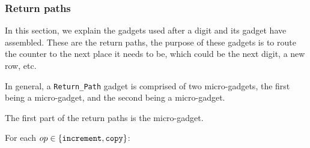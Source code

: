 

\subsubsection{ Return paths}
In this section, we explain the gadgets used after a digit and its {\dtop} gadget have assembled. These
are the return paths, the purpose of these gadgets is to route the counter to the next place it needs to be, which
could be the next digit, a new row, etc.

In general, a {\tt Return\_Path} gadget is comprised of two micro-gadgets, the first being a {\returnfromdigit} micro-gadget, and
the second being a {\readnext} micro-gadget.





The first part of the return paths is the {\returnfromdigit} micro-gadget.

For each $op\in \{ {\tt increment}, {\tt copy} \}$:


